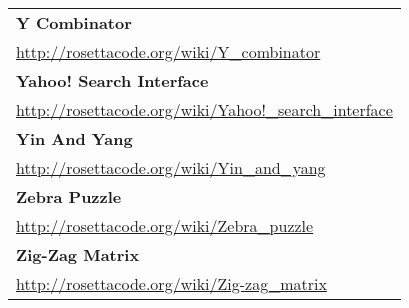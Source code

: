 \begin{longtable}{l}
\textbf{Y Combinator } \\ \href{http://rosettacode.org/wiki/Y\_combinator}{http://rosettacode.org/wiki/Y\_combinator} \\
\textbf{Yahoo! Search Interface } \\ \href{http://rosettacode.org/wiki/Yahoo!\_search\_interface}{http://rosettacode.org/wiki/Yahoo!\_search\_interface} \\
\textbf{
Yin And Yang } \\ \href{http://rosettacode.org/wiki/Yin\_and\_yang}{http://rosettacode.org/wiki/Yin\_and\_yang} \\
\textbf{Zebra Puzzle } \\ \href{http://rosettacode.org/wiki/Zebra\_puzzle}{http://rosettacode.org/wiki/Zebra\_puzzle} \\
\textbf{Zig-Zag Matrix } \\ \href{http://rosettacode.org/wiki/Zig-zag\_matrix}{http://rosettacode.org/wiki/Zig-zag\_matrix} \\
    
\end{longtable}
